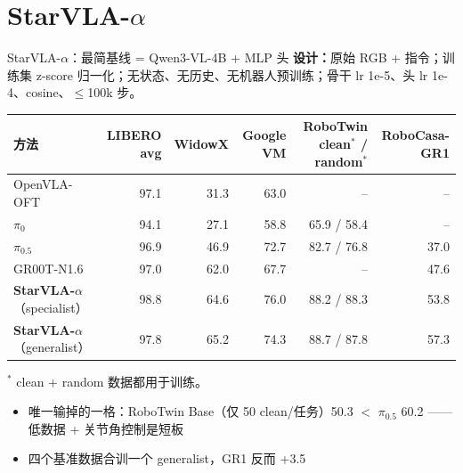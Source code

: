 \documentclass[aspectratio=169,10pt]{beamer}
\newcommand{\con}[1]{\textcolor{negative}{#1}}
\newcommand{\HL}[1]{\textcolor{emphasis}{#1}}
\begin{document}
\section{StarVLA-$\alpha$}
\begin{frame}{StarVLA-$\alpha$：最简基线 = Qwen3-VL-4B + MLP 头}
  \textbf{设计：}原始 RGB + 指令；训练集 z-score 归一化；无状态、无历史、无机器人预训练；骨干 lr 1e-5、头 lr 1e-4、cosine、$\le$100k 步。
  \vspace{4pt}
  \begin{center}\footnotesize
  \begin{tabular}{lrrrrr}
    \toprule
    方法 & LIBERO avg & WidowX & Google VM & RoboTwin clean$^*$ / random$^*$ & RoboCasa-GR1 \\
    \midrule
    OpenVLA-OFT & 97.1 & 31.3 & 63.0 & – & – \\
    $\pi_0$ & 94.1 & 27.1 & 58.8 & 65.9 / 58.4 & – \\
    $\pi_{0.5}$ & 96.9 & 46.9 & 72.7 & 82.7 / 76.8 & 37.0 \\
    GR00T-N1.6 & 97.0 & 62.0 & 67.7 & – & 47.6 \\
    \textbf{StarVLA-$\alpha$}（specialist） & \HL{98.8} & 64.6 & \HL{76.0} & 88.2 / 88.3 & 53.8 \\
    \textbf{StarVLA-$\alpha$}（generalist） & 97.8 & \HL{65.2} & 74.3 & \HL{88.7} / 87.8 & \HL{57.3} \\
    \bottomrule
  \end{tabular}
  \end{center}
  \vspace{2pt}
  {\footnotesize $^*$ clean + random 数据都用于训练。}
  \begin{itemize}
    \item 唯一输掉的一格：RoboTwin Base（仅 50 clean/任务）50.3 $<$ $\pi_{0.5}$ 60.2 —— \con{低数据 + 关节角控制是短板}
    \item 四个基准数据合训一个 generalist，GR1 反而 +3.5
  \end{itemize}
\end{frame}
\end{document}
